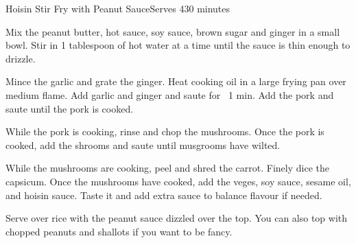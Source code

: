 \begin{recipe}{Hoisin Stir Fry with Peanut Sauce}{Serves 4}{30 minutes}

Mix the peanut butter, hot sauce, soy sauce, brown sugar and ginger
in a small bowl. Stir in 1 tablespoon of hot water at a time until the
sauce is thin enough to drizzle.

Mince the garlic and grate the ginger. Heat cooking oil in a large frying pan
over medium flame. Add garlic and ginger and saute for ~1 min.
Add the pork and saute until the pork is cooked.

While the pork is cooking, rinse and chop the mushrooms. Once
the pork is cooked, add the shrooms and saute until musgrooms have wilted.


While the mushrooms are cooking, peel and shred the carrot.
Finely dice the capsicum. Once the mushrooms have cooked, add the veges, 
soy sauce, sesame oil, and hoisin sauce. Taste it and add extra sauce
to balance flavour if needed.

\newstep Serve over rice with the peanut sauce dizzled over the top. 
You can also top with chopped peanuts and shallots if you want to be fancy.
\end{recipe}